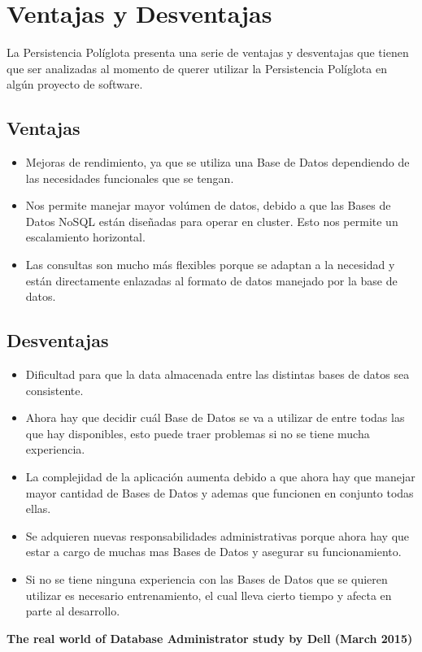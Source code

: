 \documentclass[conference,compsoc]{IEEEtran}
\begin{document}
\section{Ventajas y Desventajas}
La Persistencia Políglota presenta una serie de ventajas y desventajas que tienen que ser analizadas al momento de querer utilizar la Persistencia Políglota en algún proyecto de software.

\subsection{Ventajas}
\begin{itemize}
\item Mejoras de rendimiento, ya que se utiliza una Base de Datos dependiendo de las necesidades funcionales que se tengan.
\item Nos permite manejar mayor volúmen de datos, debido a que las Bases de Datos NoSQL están diseñadas para operar en cluster. Esto nos permite un escalamiento horizontal.
\item Las consultas son mucho más flexibles porque se adaptan a la necesidad y están directamente enlazadas al formato de datos manejado por la base de datos.
\end{itemize}
\subsection{Desventajas}
\begin{itemize}
\item Dificultad para que la data almacenada entre las distintas bases de datos sea consistente.
\item Ahora hay que decidir cuál Base de Datos se va a utilizar de entre todas las que hay disponibles, esto puede traer problemas si no se tiene mucha experiencia.
\item La complejidad de la aplicación aumenta debido a que ahora hay que manejar mayor cantidad de Bases de Datos y ademas que funcionen en conjunto todas ellas.
\item Se adquieren nuevas responsabilidades administrativas porque ahora hay que estar a cargo de muchas mas Bases de Datos y asegurar su funcionamiento.
\item Si no se tiene ninguna experiencia con las Bases de Datos que se quieren utilizar es necesario entrenamiento, el cual lleva cierto tiempo y afecta en parte al desarrollo.
\end{itemize}

\textbf{The real world of Database Administrator study by Dell (March 2015) \cite{art14} } 
 
\end{document}
